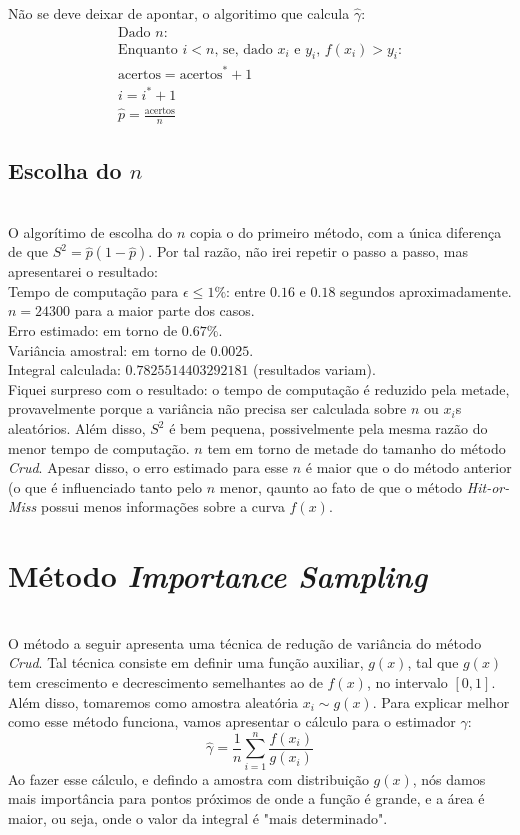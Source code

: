 \documentclass[pt12]{article}
\begin{document}
Não se deve deixar de apontar, o algoritimo que calcula $\hat{\gamma}$:
\begin{align}
\text{Dado $n$:}\\
\text{Enquanto $i<n$,\ se, dado $x_i$ e $y_i$,\ $f(x_i)>y_i$:}\\
\text{acertos$= \text{acertos}^{*}+1$}\\ 
i = i^* +1 \\
\hat{p} = \frac{\text{acertos}}{n}
\end{align}

\subsection{Escolha do $n$}
\ \\

O algorítimo de escolha do $n$ copia o do primeiro método, com a única diferença de que $S^2 = \hat{p}(1-\hat{p})$. Por tal razão, não irei repetir o passo a passo, mas apresentarei o resultado:
\ \\

\noindent Tempo de computação para $\epsilon \leq 1\%$: entre $0.16$ e $0.18$ segundos aproximadamente. \\
$n = 24300$ para a maior parte dos casos. \\
Erro estimado: em torno de $0.67\%$.\\
Variância amostral: em torno de $0.0025$.\\
Integral calculada: $0.7825514403292181$ (resultados variam).
\ \\

Fiquei surpreso com o resultado: o tempo de computação é reduzido pela metade, provavelmente porque a variância não precisa ser calculada sobre $n$ ou $x_i$s aleatórios. Além disso, $S^2$ é bem pequena, possivelmente pela mesma razão do menor tempo de computação. $n$ tem em torno de metade do tamanho do método \textit{Crud}.
Apesar disso, o erro estimado para esse $n$ é maior que o do método anterior (o que é influenciado tanto pelo $n$ menor, qaunto ao fato de que o método \textit{Hit-or-Miss} possui menos informações sobre a curva $f(x)$.
\ \\

\section{Método \textit{Importance Sampling}}
\ \\

O método a seguir apresenta uma técnica de redução de variância do método \textit{Crud}. Tal técnica consiste em definir uma função auxiliar, $g(x)$, tal que $g(x)$ tem crescimento e decrescimento semelhantes ao de $f(x)$, no intervalo $[0,1]$. Além disso, tomaremos como amostra aleatória $x_i\sim g(x)$. Para explicar melhor como esse método funciona, vamos apresentar o cálculo para o estimador $\hat{\gamma}$:
$$\hat{\gamma} = \frac{1}{n}\sum_{i=1}^{n}\frac{f(x_i)}{g(x_i)}$$
Ao fazer esse cálculo, e defindo a amostra com distribuição $g(x)$, nós damos mais importância para pontos próximos de onde a função é grande, e a área é maior, ou seja, onde o valor da integral é "mais determinado".
\ \\
\end{document}
